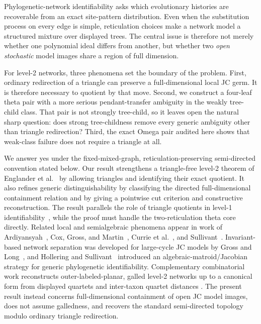 \documentclass[11pt]{article}
\theoremstyle{remark}
\begin{document}
Phylogenetic-network identifiability asks which evolutionary histories are
recoverable from an exact site-pattern distribution.  Even when the
substitution process on every edge is simple, reticulation choices make a
network model a structured mixture over displayed trees.  The central issue
is therefore not merely whether one polynomial ideal differs from another,
but whether two \emph{open stochastic} model images share a region of full
dimension.

For level-2 networks, three phenomena set the boundary of the problem.  First,
ordinary redirection of a triangle can preserve a full-dimensional local JC
germ.  It is therefore necessary to quotient by that move.  Second, we
construct a four-leaf theta pair with a more serious pendant-transfer ambiguity in
the weakly tree-child class.  That pair is not strongly tree-child, so it
leaves open the natural sharp question: does strong tree-childness remove
every generic ambiguity other than triangle redirection?  Third, the exact
Omega pair audited here shows that weak-class failure does not require a
triangle at all.

We answer yes under the fixed-mixed-graph, reticulation-preserving
semi-directed convention stated below.  Our result strengthens a
triangle-free level-2 theorem of
Englander et al.~\cite{EnglanderEtAl2026} by allowing triangles and identifying
their exact quotient.  It also refines generic distinguishability by
classifying the directed full-dimensional containment relation and by giving
a pointwise cut criterion and constructive reconstruction.  The result
parallels the role of triangle quotients in
level-1 identifiability~\cite{BritsEtAl2026}, while the proof must handle the
two-reticulation theta core directly.  Related local and semialgebraic
phenomena appear in work of Ardiyansyah~\cite{Ardiyansyah2021}, Cox, Gross,
and Martin~\cite{CoxGrossMartin2024}, Currie et al.~\cite{CurrieEtAl2026}, and
Sullivant~\cite{Sullivant2026}.  Invariant-based network separation was
developed for large-cycle JC models by Gross and Long~\cite{GrossLong2018},
and Hollering and Sullivant~\cite{HolleringSullivant2021} introduced an
algebraic-matroid/Jacobian strategy for generic phylogenetic
identifiability.  Complementary combinatorial work reconstructs
outer-labeled-planar, galled level-2 networks up to a canonical form from
displayed quartets and inter-taxon quartet distances
\cite{HoltgrefeEtAl2025Quartets}.  The present result instead concerns
full-dimensional containment of open JC model images, does not assume
galledness, and recovers the standard semi-directed topology modulo ordinary
triangle redirection.
\end{document}
